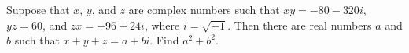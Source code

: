Suppose that $x$,  $y$,  and $z$ are complex numbers such that $xy = -80-320i$,  $yz =  60$,  and $zx =  -96+24i$,  where $i = \sqrt{-1}$. Then there are real numbers $a$ and $b$ such that $x+y+z = a+bi$. Find $a^2 + b^2$.
